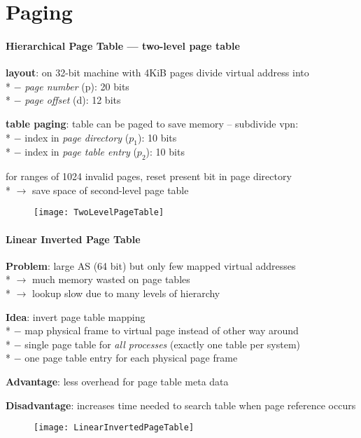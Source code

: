 \section{Paging}

\paragraph{Hierarchical Page Table --- two-level page table}
\begin{items}
  \item \textbf{layout}: on 32-bit machine with 4KiB pages divide virtual address into \\*
    $ - $ \emph{page number} (p): 20 bits \\*
    $ - $ \emph{page offset} (d): 12 bits
  \item \textbf{table paging}: table can be paged to save memory -- subdivide vpn: \\*
    $ - $ index in \emph{page directory} ($ p_1 $): 10 bits \\*
    $ - $ index in \emph{page table entry} ($ p_2 $): 10 bits
  \item for ranges of 1024 invalid pages, reset present bit in page directory \\*
    $ \to $ save space of second-level page table
\end{items}
\begin{figure}[H]\centering\label{TwoLevelPageTable}\texttt{[image: TwoLevelPageTable]}\end{figure}

\paragraph{Linear Inverted Page Table}
\begin{items}
  \item \textbf{Problem}: large AS (64 bit) but only few mapped virtual addresses \\*
    $ \to $ much memory wasted on page tables \\*
    $ \to $ lookup slow due to many levels of hierarchy
  \item \textbf{Idea}: invert page table mapping \\*
    $ - $ map physical frame to virtual page instead of other way around \\*
    $ - $ single page table for \emph{all processes} (exactly one table per system) \\*
    $ - $ one page table entry for each physical page frame
  \item \textbf{Advantage}: less overhead for page table meta data
  \item \textbf{Disadvantage}: increases time needed to search table when page reference occurs
\end{items}
\begin{figure}[H]\centering\label{LinearInvertedPageTable}\texttt{[image: LinearInvertedPageTable]}\end{figure}

